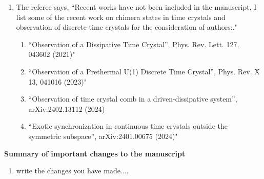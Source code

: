 \documentclass[10pt,
superscriptaddress,
amsmath,amssymb,showkeys,
aps, 
prb,
]{revtex4-2}
\newcommand{\comment}[1]{{\color{blue}#1}} %
\begin{document}
\begin{enumerate}
\begin{enumerate}
		\item The referee says, \comment{``Recent works have not been included in the manuscript, I list some of the recent work on chimera states in time crystals and observation of discrete-time crystals for the consideration of authors:."}
		\begin{enumerate}
			\item \comment{``Observation of a Dissipative Time Crystal”, Phys. Rev. Lett. 127, 043602 (2021)"}
			\item \comment{``Observation of a Prethermal U(1) Discrete Time Crystal”, Phys. Rev. X 13, 041016 (2023)"}
			\item \comment{``Observation of time crystal comb in a driven-dissipative system”, arXiv:2402.13112 (2024)}
			\item \comment{``Exotic synchronization in continuous time crystals outside the symmetric subspace”, arXiv:2401.00675 (2024)"}
		\end{enumerate}
	\end{enumerate}
\end{enumerate}
		
		

	
	
\noindent \textbf{Summary of important changes to the  manuscript}
\begin{enumerate}
	\item write the changes you have made$\dots$.
\end{enumerate}
\end{document}
